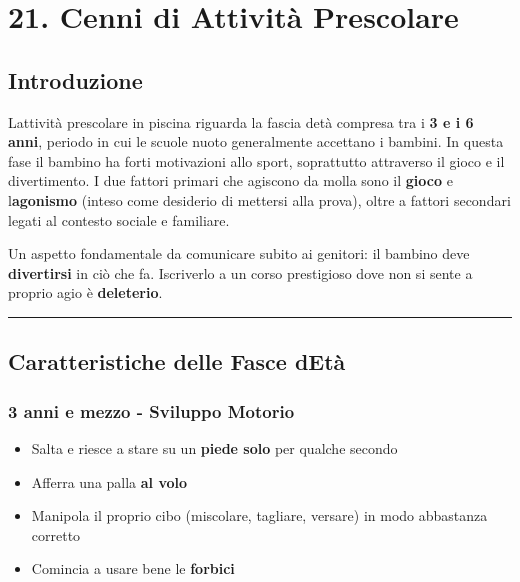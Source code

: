 \documentclass[a4paper,11pt]{article}
\providecommand{\tightlist}{%
  \setlength{\itemsep}{0pt}\setlength{\parskip}{0pt}}
\begin{document}
\section{21. Cenni di Attività
  Prescolare}\label{cenni-di-attivituxe0-prescolare}

\subsection{Introduzione}\label{introduzione-20}

L\textquotesingle attività prescolare in piscina riguarda la fascia
d\textquotesingle età compresa tra i \textbf{3 e i 6 anni}, periodo in
cui le scuole nuoto generalmente accettano i bambini. In questa fase il
bambino ha forti motivazioni allo sport, soprattutto attraverso il gioco
e il divertimento. I due fattori primari che agiscono da molla sono il
\textbf{gioco} e l\textquotesingle{}\textbf{agonismo} (inteso come
desiderio di mettersi alla prova), oltre a fattori secondari legati al
contesto sociale e familiare.

Un aspetto fondamentale da comunicare subito ai genitori: il bambino
deve \textbf{divertirsi} in ciò che fa. Iscriverlo a un corso
prestigioso dove non si sente a proprio agio è \textbf{deleterio}.

\begin{center}\rule{0.5\linewidth}{0.5pt}\end{center}

\subsection{Caratteristiche delle Fasce
      d\textquotesingle Età}\label{caratteristiche-delle-fasce-detuxe0}

\subsubsection{3 anni e mezzo - Sviluppo
      Motorio}\label{anni-e-mezzo---sviluppo-motorio}

\begin{itemize}
      \tightlist
      \item
            Salta e riesce a stare su un \textbf{piede solo} per qualche secondo
      \item
            Afferra una palla \textbf{al volo}
      \item
            Manipola il proprio cibo (miscolare, tagliare, versare) in modo
            abbastanza corretto
      \item
            Comincia a usare bene le \textbf{forbici}
\end{itemize}
\end{document}
